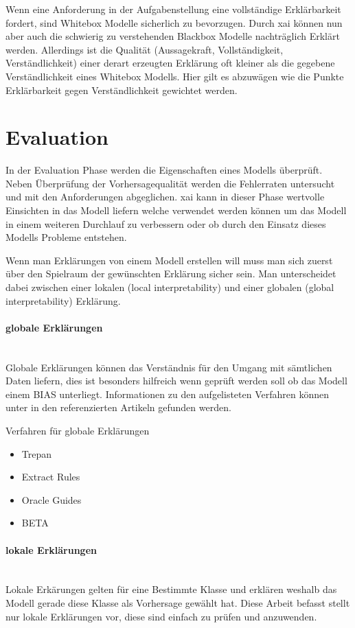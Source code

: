 \documentclass[
  12pt, %
  a4paper, %
  oneside, %
  openany, 
  numbers=noenddot, %
  BCOR=5mm, %
  parskip=half*, %
  thesis, %
]{bfhbook}
\newcommand{\parag}[1]{\paragraph*{#1}\mbox{}\\}
\begin{document}
Wenn eine Anforderung in der Aufgabenstellung eine vollständige Erklärbarkeit fordert, sind Whitebox Modelle sicherlich zu bevorzugen. Durch \Gls{xai} können nun aber auch die schwierig zu verstehenden Blackbox Modelle nachträglich Erklärt werden. Allerdings ist die Qualität (Aussagekraft, Vollständigkeit, Verständlichkeit) einer derart erzeugten Erklärung oft kleiner als die gegebene Verständlichkeit eines Whitebox Modells. Hier gilt es abzuwägen wie die Punkte Erklärbarkeit gegen Verständlichkeit gewichtet werden.

\section{Evaluation}
In der Evaluation Phase werden die Eigenschaften eines Modells überprüft. Neben Überprüfung der Vorhersagequalität werden die Fehlerraten untersucht und mit den Anforderungen abgeglichen. \Gls{xai} kann in dieser Phase wertvolle Einsichten in das Modell liefern welche verwendet werden können um das Modell in einem weiteren Durchlauf zu verbessern oder ob durch den Einsatz dieses Modells Probleme entstehen.

Wenn man Erklärungen von einem Modell erstellen will muss man sich zuerst über den Spielraum der gewünschten Erklärung sicher sein. Man unterscheidet dabei zwischen einer lokalen (local interpretability) und einer globalen (global interpretability) Erklärung.

\parag{globale Erklärungen}
Globale Erklärungen können das Verständnis für den Umgang mit sämtlichen Daten liefern, dies ist besonders hilfreich wenn geprüft werden soll ob das Modell einem \Gls{BIAS} unterliegt. Informationen zu den aufgelisteten Verfahren können unter in den referenzierten Artikeln gefunden werden.

Verfahren für globale Erklärungen
\begin{itemize}
	\item Trepan \parencite{10.5555/2998828.2998832}
	\item Extract Rules \parencite{Craven1994}
	\item Oracle Guides \parencite{Johansson2009}
	\item BETA \parencite{Lakkaraju2017}
\end{itemize}

\parag{lokale Erklärungen}
Lokale Erkärungen gelten für eine Bestimmte Klasse und erklären weshalb das Modell gerade diese Klasse als Vorhersage gewählt hat. Diese Arbeit befasst stellt nur lokale Erklärungen vor, diese sind einfach zu prüfen und anzuwenden.
\end{document}
